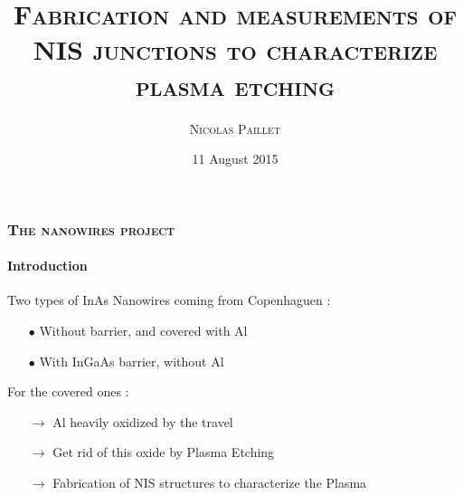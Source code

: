 \documentclass{beamer}
\title[\textsc{Fabrication and measurements of NIS junctions}]{\textsc{Fabrication and measurements of\\NIS junctions to characterize\\plasma etching}}
\author{\textsc{Nicolas Paillet}}
\institute{Aalto University}
\date{11 August 2015}
\begin{document}
\begin{frame}
    \titlepage
\end{frame}

    
    \begin{frame}
        \frametitle{\textsc{The nanowires project}}
        \framesubtitle{Introduction}
        Two types of InAs Nanowires coming from Copenhaguen : \\
        \begin{itemize}
            \item[$\bullet$]{Without barrier, and covered with Al}
            \item[$\bullet$]{With InGaAs barrier, without Al} 
        \end{itemize}
         
        For the covered ones :
        \begin{itemize}        
        \item[$\longrightarrow$] {Al heavily oxidized by the travel}
        \item[$\longrightarrow$] {Get rid of this oxide by Plasma Etching}
        \item[$\longrightarrow$] {Fabrication of NIS structures to characterize the Plasma}
        \end{itemize}
    \end{frame}
\end{document}
